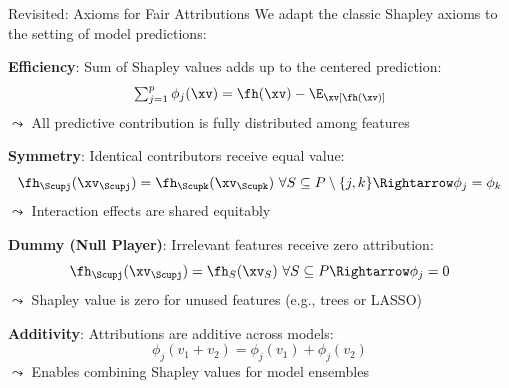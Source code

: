 \documentclass[10pt,compress,t,notes=noshow, xcolor=table]{beamer}
\begin{document}
\begin{framev}[align=top]{Revisited: Axioms for Fair Attributions}
We adapt the classic Shapley axioms to the setting of model predictions:
\\
\spacer[0.25]
\begin{itemizeM}%
\item \textbf{Efficiency}: Sum of Shapley values adds up to the centered prediction:
$$
\textstyle\sum_{j=1}^p \phi_j(\xv) = \fh(\xv) - \E_\xv[\fh(\xv)]
$$
$\leadsto$ All predictive contribution is fully distributed among features
\item \textbf{Symmetry}: Identical contributors receive equal value:
$$
\fh_{\Scupj}(\xv_{\Scupj}) = \fh_{\Scupk}(\xv_{\Scupk}) \ \forall S \subseteq P \setminus \{j,k\}
\Rightarrow \phi_j = \phi_k
$$
$\leadsto$ Interaction effects are shared equitably
\item \textbf{Dummy (Null Player)}: Irrelevant features receive zero attribution:
$$
\fh_{\Scupj}(\xv_{\Scupj}) = \fh_S(\xv_S) \ \forall S \subseteq P \Rightarrow \phi_j = 0
$$
$\leadsto$ Shapley value is zero for unused features (e.g., trees or LASSO)
\item \textbf{Additivity}: Attributions are additive across models:
$$
\phi_j(v_1 + v_2) = \phi_j(v_1) + \phi_j(v_2)
$$
$\leadsto$ Enables combining Shapley values for model ensembles
\end{itemizeM}
\end{framev}





\end{document}
